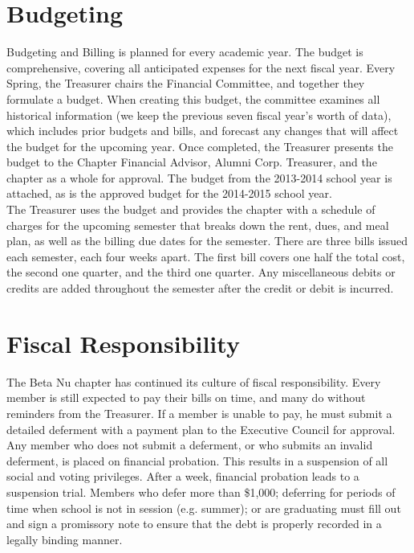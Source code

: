   \section*{Budgeting}
    Budgeting and Billing is planned for every academic year. The budget is comprehensive, covering all anticipated expenses for the next fiscal year. Every Spring, the Treasurer chairs the Financial Committee, and together they formulate a budget. When creating this budget, the committee examines all historical information (we keep the previous seven fiscal year’s worth of data), which includes prior budgets and bills, and forecast any changes that will affect the budget for the upcoming year. Once completed, the Treasurer presents the budget to the Chapter Financial Advisor, Alumni Corp. Treasurer, and the chapter as a whole for approval. The budget from the 2013-2014 school year is attached, as is the approved budget for the 2014-2015 school year. \\

    The Treasurer uses the budget and provides the chapter with a schedule of charges for the upcoming semester that breaks down the rent, dues, and meal plan, as well as the billing due dates for the semester. There are three bills issued each semester, each four weeks apart. The first bill covers one half the total cost, the second one quarter, and the third one quarter. Any miscellaneous debits or credits are added throughout the semester after the credit or debit is incurred.
    
  \section*{Fiscal Responsibility}
  
    The Beta Nu chapter has continued its culture of fiscal responsibility. Every member is still expected to pay their bills on time, and many do without reminders from the Treasurer. If a member is unable to pay, he must submit a detailed deferment with a payment plan to the Executive Council for approval. Any member who does not submit a deferment, or who submits an invalid deferment, is placed on financial probation. This results in a suspension of all social and voting privileges. After a week, financial probation leads to a suspension trial. Members who defer more than \$1,000; deferring for periods of time when school is not in session (e.g. summer); or are graduating must fill out and sign a promissory note to ensure that the debt is properly recorded in a legally binding manner. \\

